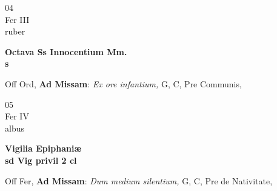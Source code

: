 \documentclass[10pt, openany]{book}
\begin{document}
        \begin{center}
            \begin{minipage}{3.5in}
                \vspace{2em}
                \begin{minipage}{0.5in}
                    {\Huge 04} \\
                    {\normalsize Fer III} \\
                    {\normalsize ruber}
                \end{minipage}
                \begin{minipage}{3.0in}
                    \textbf{ \large Octava Ss Innocentium Mm. \\
                    \textnormal{\normalsize s}} \\ 
                \end{minipage}
                \begin{justify}Off Ord, \textbf{Ad Missam}: \textit{Ex ore infantium,} G, C, Pre Communis,   
                \end{justify}
            \end{minipage}
        \end{center}
    
        \begin{center}
            \begin{minipage}{3.5in}
                \vspace{2em}
                \begin{minipage}{0.5in}
                    {\Huge 05} \\
                    {\normalsize Fer IV} \\
                    {\normalsize albus}
                \end{minipage}
                \begin{minipage}{3.0in}
                    \textbf{ \large Vigilia Epiphaniæ \\
                    \textnormal{\normalsize sd Vig privil 2 cl}} \\ 
                \end{minipage}
                \begin{justify}Off Fer, \textbf{Ad Missam}: \textit{Dum medium silentium,} G, C, Pre de Nativitate,   
                \end{justify}
            \end{minipage}
        \end{center}
    
\end{document}

